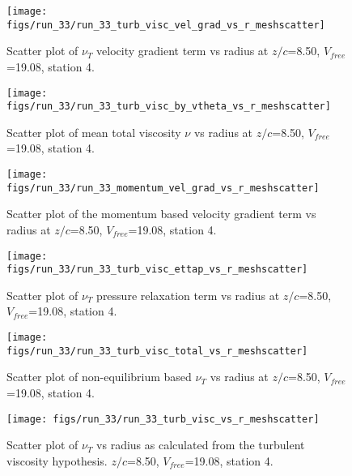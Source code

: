 \begin{figure}[H]
\centering
\texttt{[image: figs/run\_33/run\_33\_turb\_visc\_vel\_grad\_vs\_r\_meshscatter]}
\caption{Scatter plot of $\nu_T$ velocity gradient term vs radius at $z/c$=8.50, $V_{free}$=19.08, station 4.}
\end{figure}


\begin{figure}[H]
\centering
\texttt{[image: figs/run\_33/run\_33\_turb\_visc\_by\_vtheta\_vs\_r\_meshscatter]}
\caption{Scatter plot of mean total viscosity $\nu$ vs radius at $z/c$=8.50, $V_{free}$=19.08, station 4.}
\end{figure}


\begin{figure}[H]
\centering
\texttt{[image: figs/run\_33/run\_33\_momentum\_vel\_grad\_vs\_r\_meshscatter]}
\caption{Scatter plot of the momentum based velocity gradient term vs radius at $z/c$=8.50, $V_{free}$=19.08, station 4.}
\end{figure}


\begin{figure}[H]
\centering
\texttt{[image: figs/run\_33/run\_33\_turb\_visc\_ettap\_vs\_r\_meshscatter]}
\caption{Scatter plot of $\nu_T$ pressure relaxation term vs radius at $z/c$=8.50, $V_{free}$=19.08, station 4.}
\end{figure}


\begin{figure}[H]
\centering
\texttt{[image: figs/run\_33/run\_33\_turb\_visc\_total\_vs\_r\_meshscatter]}
\caption{Scatter plot of non-equilibrium based $\nu_T$ vs radius at $z/c$=8.50, $V_{free}$=19.08, station 4.}
\end{figure}


\begin{figure}[H]
\centering
\texttt{[image: figs/run\_33/run\_33\_turb\_visc\_vs\_r\_meshscatter]}
\caption{Scatter plot of $\nu_T$ vs radius as calculated from the turbulent viscosity hypothesis. $z/c$=8.50, $V_{free}$=19.08, station 4.}
\end{figure}


